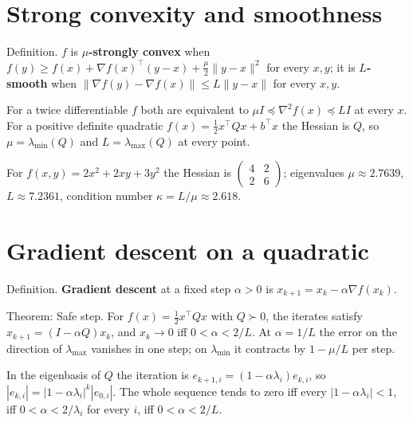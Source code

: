 \documentclass[11pt,a4paper]{article}
\begin{document}
\section{Strong convexity and smoothness}\label{sec:strongL}

\begin{definitionbox}{Definition.}
$f$ is \textbf{$\mu$-strongly convex} when $f(y)\ge f(x)+\nabla f(x)^\top(y-x)+\tfrac{\mu}{2}\|y-x\|^2$ for every $x,y$; it is \textbf{$L$-smooth} when $\|\nabla f(y)-\nabla f(x)\|\le L\|y-x\|$ for every $x,y$.
\end{definitionbox}

For a twice differentiable $f$ both are equivalent to $\mu I\preceq\nabla^2 f(x)\preceq L I$ at every $x$. For a positive definite quadratic $f(x)=\tfrac{1}{2}x^\top Qx+b^\top x$ the Hessian is $Q$, so $\mu=\lambda_{\min}(Q)$ and $L=\lambda_{\max}(Q)$ at every point.

\begin{examplebox}
For $f(x,y)=2x^2+2xy+3y^2$ the Hessian is $\begin{pmatrix}4&2\\2&6\end{pmatrix}$; eigenvalues $\mu\approx 2.7639$, $L\approx 7.2361$, condition number $\kappa=L/\mu\approx 2.618$.
\end{examplebox}

\section{Gradient descent on a quadratic}\label{sec:gd}

\begin{definitionbox}{Definition.}
\textbf{Gradient descent} at a fixed step $\alpha>0$ is $x_{k+1}=x_k-\alpha\nabla f(x_k)$.
\end{definitionbox}

\begin{theorembox}{Theorem: Safe step.}
For $f(x)=\tfrac{1}{2}x^\top Qx$ with $Q\succ0$, the iterates satisfy $x_{k+1}=(I-\alpha Q)x_k$, and $x_k\to0$ iff $0<\alpha<2/L$. At $\alpha=1/L$ the error on the direction of $\lambda_{\max}$ vanishes in one step; on $\lambda_{\min}$ it contracts by $1-\mu/L$ per step.
\end{theorembox}

\begin{proofbox}
In the eigenbasis of $Q$ the iteration is $e_{k+1,i}=(1-\alpha\lambda_i)e_{k,i}$, so $|e_{k,i}|=|1-\alpha\lambda_i|^k|e_{0,i}|$. The whole sequence tends to zero iff every $|1-\alpha\lambda_i|<1$, iff $0<\alpha<2/\lambda_i$ for every $i$, iff $0<\alpha<2/L$.
\end{proofbox}
\end{document}
